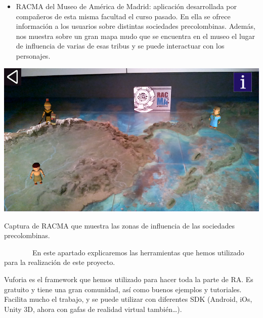 \documentclass[]{article}
\begin{document}
\begin{itemize}
\itemsep1pt\parskip0pt
\item
  RACMA del Museo de América de Madrid: aplicación desarrollada por
  compañeros de esta misma facultad el curso pasado. En ella se ofrece
  información a los usuarios sobre distintas sociedades precolombinas.
  Además, nos muestra sobre un gran mapa mudo que se encuentra en el
  museo el lugar de influencia de varias de esas tribus y se puede
  interactuar con los personajes.
\end{itemize}

\includegraphics{images/image01.png}

Captura de RACMA que muestra las zonas de influencia de las sociedades
precolombinas.


~~~~~~~~En este apartado explicaremos las herramientas que hemos
utilizado para la realización de este proyecto.


Vuforia es el framework que hemos utilizado para hacer toda la parte de
RA. Es gratuito y tiene una gran comunidad, así como buenos ejemplos y
tutoriales. Facilita mucho el trabajo, y se puede utilizar con
diferentes SDK (Android, iOs, Unity 3D, ahora con gafas de realidad
virtual también\ldots{}).

\end{document}
